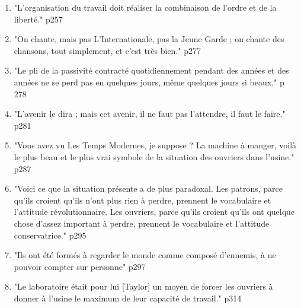 \documentclass[a4paper,12pt]{book}
\begin{document}
{\begin{enumerate}
\item "L'organisation du travail doit réaliser la combinaison de l'ordre et de la liberté." p257
\item "On chante, mais pas L'Internationale, pas la Jeune Garde ; on chante des chansons, tout simplement, et c'est très bien." p277
\item "Le pli de la passivité contracté quotidiennement pendant des années et des années ne se perd pas en quelques jours, même quelques jours si beaux." p 278
\item "L'avenir le dira ; mais cet avenir, il ne faut pas l'attendre, il faut le faire." p281
\item "Vous avez vu Les Temps Modernes, je suppose ? La machine à manger, voilà le plus beau et le plus vrai symbole de la situation des ouvriers dans l'usine." p287
\item "Voici ce que la situation présente a de plus paradoxal. Les patrons, parce qu'ils croient qu'ils n'ont plus rien à perdre, prennent le vocabulaire et l'attitude révolutionnaire. Les ouvriers, parce qu'ils croient qu'ils ont quelque chose d'assez important à perdre, prennent le vocabulaire et l'attitude conservatrice." p295
\item "Ils ont été formés à regarder le monde comme composé d'ennemis, à ne pouvoir compter sur personne" p297
\item "Le laboratoire était pour lui [Taylor] un moyen de forcer les ouvriers à donner à l'usine le maximum de leur capacité de travail." p314
\end{enumerate}
}
\end{document}
